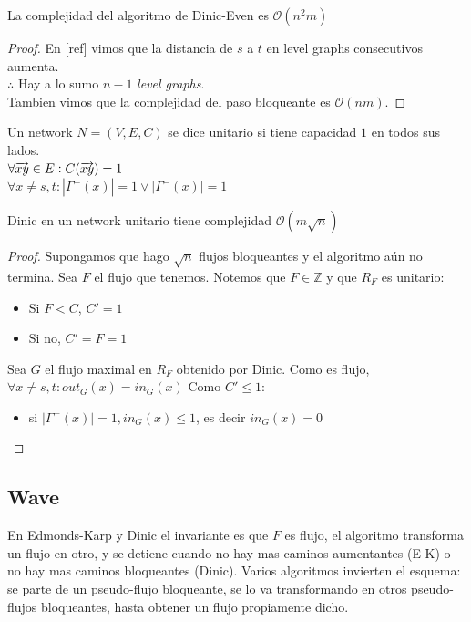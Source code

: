 \begin{theorem}
La complejidad del algoritmo de Dinic-Even es $\mathcal{O}(n^2 m)$
\end{theorem}
\begin{proof}
En [ref] vimos que la distancia de $s$ a $t$ en level graphs consecutivos aumenta.\\
$\therefore$ Hay a lo sumo $n-1$ \textit{level graphs}.\\
Tambien vimos que la complejidad del paso bloqueante es $\mathcal{O}(nm)$.
\end{proof}

\begin{definition}
Un network $N = (V,E,C)$ se dice unitario si tiene capacidad $1$ en todos sus lados.\\
$\forall \overrightarrow{xy} \in E : C(\overrightarrow{xy}) = 1$ \\
$\forall x \neq s,t : |\Gamma^+(x)| = 1 \veebar |\Gamma^-(x)| = 1$
\end{definition}
\begin{theorem}
Dinic en un network unitario tiene complejidad $\mathcal{O}(m\sqrt{n})$
\end{theorem}

\begin{proof}
Supongamos que hago $\sqrt{n}$ flujos bloqueantes y el algoritmo aún no termina.
Sea $F$ el flujo que tenemos. Notemos que $F \in \mathbb{Z}$ y que $R_F$ es unitario:
\begin{itemize}
    \item Si $F < C$, $C' = 1$
    \item Si no, $C' = F = 1$
\end{itemize}
Sea $G$ el flujo maximal en $R_F$ obtenido por Dinic.
Como es flujo, $\forall x \neq s,t : out_G(x) = in_G(x)$
Como $C' \le 1$:
\begin{itemize}
    \item si $|\Gamma^-(x)| = 1, in_G(x) \le 1$, es decir $in_G(x) = 0$
\end{itemize}
\end{proof}

\subsection{Wave}
En Edmonds-Karp y Dinic el invariante es que $F$ es flujo, el algoritmo transforma un flujo en otro, y se detiene cuando no hay mas caminos aumentantes (E-K) o no hay mas caminos bloqueantes (Dinic).
Varios algoritmos invierten el esquema: se parte de un pseudo-flujo bloqueante, se lo va transformando en otros pseudo-flujos bloqueantes, hasta obtener un flujo propiamente dicho.

